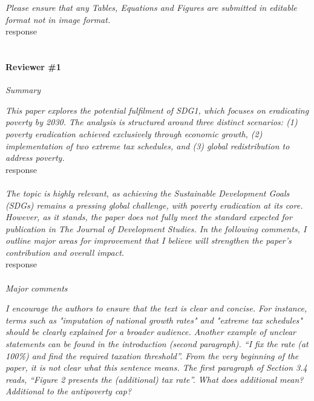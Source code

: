 \documentclass[12pt,english]{article}
\begin{document}
\textit{Please ensure that any Tables, Equations and Figures are submitted in editable format not in image format.}~\\

response
~\\ ~\\


\paragraph*{Reviewer \#1}

\textit{Summary}

\textit{This paper explores the potential fulfilment of SDG1, which focuses on eradicating poverty by 2030. The analysis is structured around three distinct scenarios: (1) poverty eradication achieved exclusively through economic growth, (2) implementation of two extreme tax schedules, and (3) global redistribution to address poverty. }~\\

response
~\\ ~\\

\textit{The topic is highly relevant, as achieving the Sustainable Development Goals (SDGs) remains a pressing global challenge, with poverty eradication at its core. However, as it stands, the paper does not fully meet the standard expected for publication in The Journal of Development Studies. In the following comments, I outline major areas for improvement that I believe will strengthen the paper's contribution and overall impact.}~\\

response
~\\ ~\\ 

\textit{Major comments}

\textit{I encourage the authors to ensure that the text is clear and concise. For instance, terms such as "imputation of national growth rates" and "extreme tax schedules" should be clearly explained for a broader audience. Another example of unclear statements can be found in the introduction (second paragraph). “I fix the rate (at 100\%) and find the required taxation threshold”. From the very beginning of the paper, it is not clear what this sentence means. The first paragraph of Section 3.4 reads, “Figure 2 presents the (additional) tax rate”. What does additional mean? Additional to the antipoverty cap? }~\\
\end{document}
